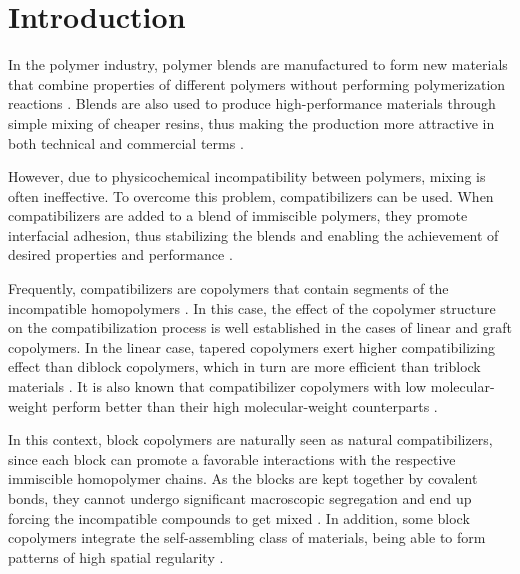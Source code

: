 \documentclass[
aip,
jcp,
reprint,
]{revtex4-1}
\begin{document}
\maketitle

\section{Introduction}
\label{sec:introduction}

In the polymer industry, polymer blends are manufactured to form new materials that combine properties of different polymers without performing polymerization reactions \cite{Baker_2001}.
Blends are also used to produce high-performance materials through simple mixing of cheaper resins, thus making the production more attractive in both technical and commercial terms \cite{Wang_2012}.

However, due to physicochemical incompatibility between polymers, mixing is often ineffective.
To overcome this problem, compatibilizers can be used.
When compatibilizers are added to a blend of immiscible polymers, they promote interfacial adhesion, thus stabilizing the blends and enabling the achievement of desired properties and performance \cite{Baker_2001}.

Frequently, compatibilizers are copolymers that contain segments of the incompatible homopolymers \cite{Baker_2001, Wang_2012, Chuai_2003, Lyatskaya_1996, Yuan_2006}. In this case, the effect of the copolymer structure on the compatibilization process is well established in the cases of linear \cite{Chuai_2003} and graft \cite{Lyatskaya_1996, Wang_2012} copolymers.
In the linear case, tapered copolymers exert higher compatibilizing effect than diblock copolymers, which in turn are more efficient than triblock materials \cite{Yuan_2006, Kim_2006, Lemos_2015}.
It is also known that compatibilizer copolymers with low molecular-weight perform better than their high molecular-weight counterparts \cite{Harrats_1995}.

In this context, block copolymers are naturally seen as natural compatibilizers, since each block can promote a favorable interactions with the respective immiscible homopolymer chains.
As the blocks are kept together by covalent bonds, they cannot undergo significant macroscopic segregation and end up forcing the incompatible compounds to get mixed \cite{Baker_2001}.
In addition, some block copolymers integrate the self-assembling class of materials, being able to form patterns of high spatial regularity \cite{Leibler_1980}.
\end{document}
